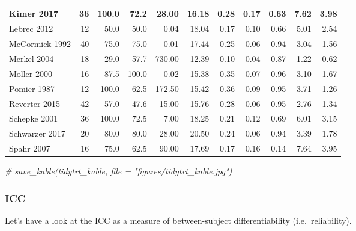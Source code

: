 \documentclass[
]{article}
\newenvironment{Shaded}{\begin{snugshade}}{\end{snugshade}}
\newcommand{\CommentTok}[1]{\textcolor[rgb]{0.56,0.35,0.01}{\textit{#1}}}
\begin{document}
\begin{table}[H]
\begin{tabular}{l|r|r|r|r|r|r|r|r|r|r}
\hline
\hspace{1em}Kimer 2017 & 36 & 100.0 & 72.2 & 28.00 & 16.18 & 0.28 & 0.17 & 0.63 & 7.62 & 3.98\\
\hline
\hspace{1em}Lebrec 2012 & 12 & 50.0 & 50.0 & 0.04 & 18.04 & 0.17 & 0.10 & 0.66 & 5.01 & 2.54\\
\hline
\hspace{1em}McCormick 1992 & 40 & 75.0 & 75.0 & 0.01 & 17.44 & 0.25 & 0.06 & 0.94 & 3.04 & 1.56\\
\hline
\hspace{1em}Merkel 2004 & 18 & 29.0 & 57.7 & 730.00 & 12.39 & 0.10 & 0.04 & 0.87 & 1.22 & 0.62\\
\hline
\hspace{1em}Moller 2000 & 16 & 87.5 & 100.0 & 0.02 & 15.38 & 0.35 & 0.07 & 0.96 & 3.10 & 1.67\\
\hline
\hspace{1em}Pomier 1987 & 12 & 100.0 & 62.5 & 172.50 & 15.42 & 0.36 & 0.09 & 0.95 & 3.71 & 1.26\\
\hline
\hspace{1em}Reverter 2015 & 42 & 57.0 & 47.6 & 15.00 & 15.76 & 0.28 & 0.06 & 0.95 & 2.76 & 1.34\\
\hline
\hspace{1em}Schepke 2001 & 36 & 100.0 & 72.5 & 7.00 & 18.25 & 0.21 & 0.12 & 0.69 & 6.01 & 3.15\\
\hline
\hspace{1em}Schwarzer 2017 & 20 & 80.0 & 80.0 & 28.00 & 20.50 & 0.24 & 0.06 & 0.94 & 3.39 & 1.78\\
\hline
\hspace{1em}Spahr 2007 & 16 & 75.0 & 62.5 & 90.00 & 17.69 & 0.17 & 0.16 & 0.14 & 7.64 & 3.95\\
\hline
\end{tabular}
\end{table}

\begin{Shaded}
\begin{Highlighting}[]
\CommentTok{\# save\_kable(tidytrt\_kable, file = "figures/tidytrt\_kable.jpg")}
\end{Highlighting}
\end{Shaded}

\hypertarget{icc}{%
\subsubsection{ICC}\label{icc}}

Let's have a look at the ICC as a measure of between-subject
differentiability (i.e.~reliability).
\end{document}
